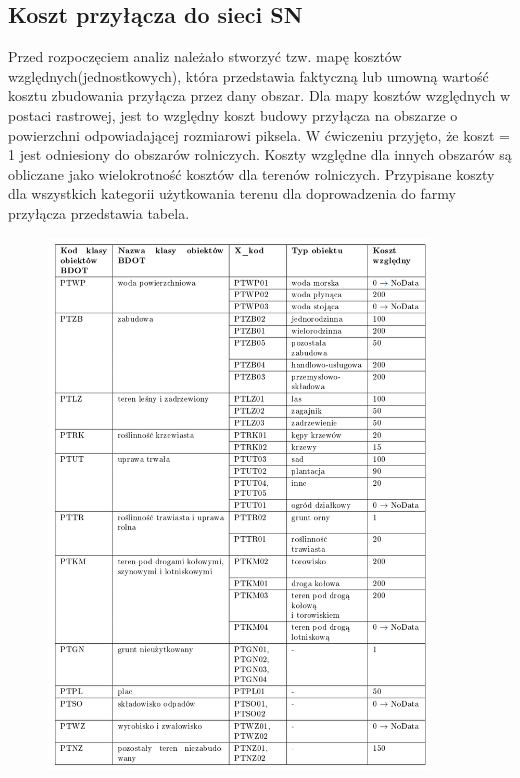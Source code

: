 \documentclass{article}
\begin{document}
\subsection{Koszt przyłącza do sieci SN}
Przed rozpoczęciem analiz należało stworzyć tzw. mapę kosztów względnych(jednostkowych), która przedstawia faktyczną lub umowną wartość kosztu zbudowania
przyłącza przez dany obszar. Dla mapy kosztów względnych w postaci rastrowej, jest to względny koszt budowy przyłącza na obszarze o powierzchni odpowiadającej rozmiarowi
piksela. W ćwiczeniu przyjęto, że koszt = 1 jest odniesiony do obszarów rolniczych. Koszty względne dla innych obszarów są obliczane jako wielokrotność kosztów dla terenów rolniczych. Przypisane koszty dla wszystkich kategorii użytkowania terenu dla doprowadzenia do
farmy przyłącza przedstawia tabela.

\begin{figure}[H]
    \centering
    \includegraphics[width=0.9\textwidth]{img/tabela_kosztow_wzglednych.png}
    \caption*{}
\end{figure}
\end{document}
